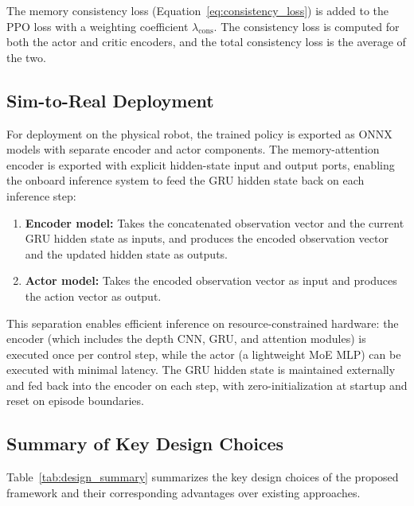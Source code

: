 The memory consistency loss (Equation~\ref{eq:consistency_loss}) is added to the PPO loss with a weighting coefficient $\lambda_{\text{cons}}$. The consistency loss is computed for both the actor and critic encoders, and the total consistency loss is the average of the two.

\subsection{Sim-to-Real Deployment}
\label{sec:sim2real}

For deployment on the physical robot, the trained policy is exported as ONNX models with separate encoder and actor components. The memory-attention encoder is exported with explicit hidden-state input and output ports, enabling the onboard inference system to feed the GRU hidden state back on each inference step:

\begin{enumerate}
    \item \textbf{Encoder model:} Takes the concatenated observation vector and the current GRU hidden state as inputs, and produces the encoded observation vector and the updated hidden state as outputs.
    \item \textbf{Actor model:} Takes the encoded observation vector as input and produces the action vector as output.
\end{enumerate}

This separation enables efficient inference on resource-constrained hardware: the encoder (which includes the depth CNN, GRU, and attention modules) is executed once per control step, while the actor (a lightweight MoE MLP) can be executed with minimal latency. The GRU hidden state is maintained externally and fed back into the encoder on each step, with zero-initialization at startup and reset on episode boundaries.

\subsection{Summary of Key Design Choices}

Table~\ref{tab:design_summary} summarizes the key design choices of the proposed framework and their corresponding advantages over existing approaches.

